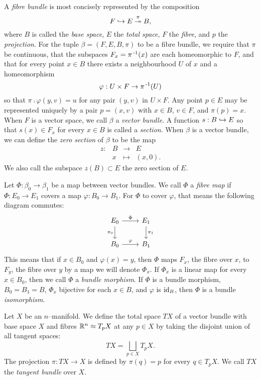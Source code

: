 \begin{defn}[Bundles]
	A \emph{fibre bundle} is most concisely represented by the composition
	\[
		F\hookrightarrow E\overset{\pi}{\twoheadrightarrow} B,
	\]
	where $B$ is called the \emph{base space}, $E$ the \emph{total space}, $F$ the \emph{fibre}, and $p$ the \emph{projection}.
	For the tuple $\beta = (F,E,B,\pi)$ to be a fibre bundle, we require that $\pi$ be continuous, that the subspaces $F_x = \pi^{\,\text{-}1}(x)$ are each homeomorphic to $F$, and that for every point $x\in B$ there exists a neighbourhood $U$ of $x$ and a homeomorphism
	\[
		\varphi: U\times F\to \pi^{\,\text{-}1}(U)
	\]
	so that $\pi\comp\varphi(y,v)=u$ for any pair $(y,v)$ in $U\times F$.
	Any point $p\in E$ may be represented uniquely by a pair $p=(x,v)$ with $x\in B$, $v\in F$, and $\pi(p)=x$.
	When $F$ is a vector space, we call $\beta$ a \emph{vector bundle}.
	A function $s:B\hookrightarrow E$ so that $s(x)\in F_x$ for every $x\in B$ is called a \emph{section}.
	When $\beta$ is a vector bundle, we can define the \emph{zero section} of $\beta$ to be the map
	\[
		\begin{array}{cccc}
			z: & B & \to 	 & E \\
			   & x & \mapsto & (x,0).
		\end{array}
	\]
	We also call the subspace $z(B)\subset E$ the zero section of $E$.
\end{defn}

\begin{defn}
	Let $\Phi:\beta_0\to \beta_1$ be a map between vector bundles.
	We call $\Phi$ a \emph{fibre map} if $\Phi:E_0\to E_1$ covers a map $\varphi:B_0\to B_1$.
	For $\Phi$ to cover $\varphi$, that means the following diagram commutes:
	\[
		\begin{tikzcd}
			E_0 \arrow{r}{\Phi} \arrow[swap]{d}{\pi_0} & E_1 \arrow{d}{\pi_1} \\
			B_0 \arrow{r}{\varphi} & B_1
		\end{tikzcd}
	\]
	This means that if $x\in B_0$ and $\varphi(x)=y$, then $\Phi$ maps $F_x$, the fibre over $x$, to $F_y$, the fibre over $y$ by a map we will denote $\Phi_x$.
	If $\Phi_x$ is a linear map for every $x\in B_0$, then we call $\Phi$ a \emph{bundle morphism}.
	If $\Phi$ is a bundle morphism, $B_0=B_1=B$, $\Phi_x$ bijective for each $x\in B$, and $\varphi$ is $\textrm{id}_{B}$, then $\Phi$ is a bundle \emph{isomorphism}.
\end{defn}

\begin{defn}
	Let $X$ be an $n$--manifold.
	We define the total space $TX$ of a vector bundle with base space $X$ and fibres $\mathbb{R}^n\approx T_p X$ at any $p\in X$ by taking the disjoint union of all tangent spaces:
	\[
		TX = \bigsqcup_{p\in X} T_p X.
	\]
	The projection $\pi:TX\to X$ is defined by $\pi(q)=p$ for every $q\in T_p X$.
	We call $TX$ the \emph{tangent bundle} over $X$.
\end{defn}


